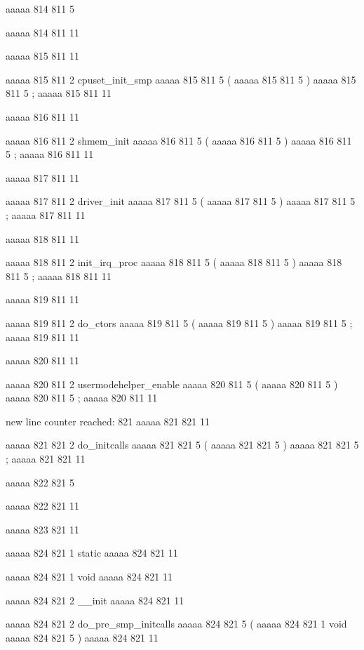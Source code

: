 aaaaa 814 811
5
{
aaaaa 814 811
11


aaaaa 815 811
11
	
aaaaa 815 811
2
cpuset_init_smp
aaaaa 815 811
5
(
aaaaa 815 811
5
)
aaaaa 815 811
5
;
aaaaa 815 811
11


aaaaa 816 811
11
	
aaaaa 816 811
2
shmem_init
aaaaa 816 811
5
(
aaaaa 816 811
5
)
aaaaa 816 811
5
;
aaaaa 816 811
11


aaaaa 817 811
11
	
aaaaa 817 811
2
driver_init
aaaaa 817 811
5
(
aaaaa 817 811
5
)
aaaaa 817 811
5
;
aaaaa 817 811
11


aaaaa 818 811
11
	
aaaaa 818 811
2
init_irq_proc
aaaaa 818 811
5
(
aaaaa 818 811
5
)
aaaaa 818 811
5
;
aaaaa 818 811
11


aaaaa 819 811
11
	
aaaaa 819 811
2
do_ctors
aaaaa 819 811
5
(
aaaaa 819 811
5
)
aaaaa 819 811
5
;
aaaaa 819 811
11


aaaaa 820 811
11
	
aaaaa 820 811
2
usermodehelper_enable
aaaaa 820 811
5
(
aaaaa 820 811
5
)
aaaaa 820 811
5
;
aaaaa 820 811
11


new line counter reached: 821
aaaaa 821 821
11
	
aaaaa 821 821
2
do_initcalls
aaaaa 821 821
5
(
aaaaa 821 821
5
)
aaaaa 821 821
5
;
aaaaa 821 821
11


aaaaa 822 821
5
}
aaaaa 822 821
11


aaaaa 823 821
11


aaaaa 824 821
1
static
aaaaa 824 821
11
 
aaaaa 824 821
1
void
aaaaa 824 821
11
 
aaaaa 824 821
2
__init
aaaaa 824 821
11
 
aaaaa 824 821
2
do_pre_smp_initcalls
aaaaa 824 821
5
(
aaaaa 824 821
1
void
aaaaa 824 821
5
)
aaaaa 824 821
11


